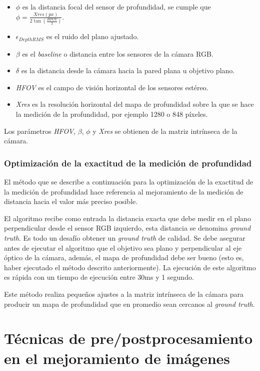 \begin{itemize}
	\item $\phi$ es la distancia focal del sensor de profundidad, se cumple que $\phi = \frac{Xres(px)}{2\tan(\frac{HFOV}{2})}$.
	\item $\epsilon_{DepthRMS}$ es el ruido del plano ajustado.
	\item $\beta$ es el \textit{baseline} o distancia entre los sensores de la cámara RGB.
	\item $\delta$ es la distancia desde la cámara hacia la pared plana u objetivo plano.
	\item \textit{HFOV} es el campo de visión horizontal de los sensores estéreo.
	\item \textit{Xres} es la resolución horizontal del mapa de profundidad sobre la que se hace la medición de la profundidad, por ejemplo 1280 o 848 píxeles.
\end{itemize} 

Los parámetros \textit{HFOV}, $\beta$, $\phi$ y \textit{Xres} se obtienen de la matriz intrínseca de la cámara. 

\subsubsection{Optimización de la exactitud de la medición de profundidad}

El método que se describe a continuación para la optimización de la exactitud de la medición de profundidad hace referencia al mejoramiento de la medición de distancia hacia el valor más preciso posible.

El algoritmo recibe como entrada la distancia exacta que debe medir en el plano perpendicular desde el sensor RGB izquierdo, esta distancia se denomina \textit{ground truth}. Es todo un desafío obtener un \textit{ground truth} de calidad. Se debe asegurar antes de ejecutar el algoritmo que el objetivo sea plano y perpendicular al eje óptico de la cámara, además, el mapa de profundidad debe ser bueno (esto es, haber ejecutado el método descrito anteriormente). La ejecución de este algoritmo es rápida con un tiempo de ejecución entre 30ms y 1 segundo. 

Este método realiza pequeños ajustes a la matriz intrínseca de la cámara para producir un mapa de profundidad que en promedio sean cercanos al \textit{ground truth}. 

\section{Técnicas de pre/postprocesamiento en el mejoramiento de imágenes}\label{section:imgEnh}

